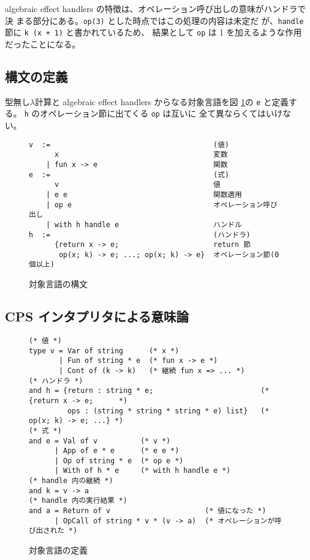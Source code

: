 algebraic effect handlers の特徴は、オペレーション呼び出しの意味がハンドラで決
まる部分にある。\texttt{op(3)} とした時点ではこの処理の内容は未定だ
が、\texttt{handle} 節に \texttt{k (x + 1)} と書かれているため、
結果として \texttt{op} は 1 を加えるような作用だったことになる。

\subsection{構文の定義}
\label{subsection:syntax}
型無し$\lambda$計算と algebraic effect handlers からなる対象言語を図 \ref{figure:abstract_syntax}の \texttt{e} と定義する。
\texttt{h} のオペレーション節に出てくる \texttt{op} は互いに
全て異ならくてはいけない。

\begin{figure}[t]
\begin{spacing}{0.9}
\begin{verbatim}
v  :=                                      (値)
      x                                    変数
    | fun x -> e                           関数
e  :=                                      (式)
      v                                    値
    | e e                                  関数適用
    | op e                                 オペレーション呼び出し
    | with h handle e                      ハンドル
h  :=                                      (ハンドラ)
      {return x -> e;                      return 節
       op(x; k) -> e; ...; op(x; k) -> e}  オペレーション節(0個以上)
\end{verbatim}
\end{spacing}
\caption{対象言語の構文}
\label{figure:abstract_syntax}
\end{figure}

\subsection{CPS インタプリタによる意味論}
\label{subsection:1cps}

\begin{figure}[t]
\begin{spacing}{0.9}
\begin{verbatim}
(* 値 *)
type v = Var of string      (* x *)
       | Fun of string * e  (* fun x -> e *)
       | Cont of (k -> k)   (* 継続 fun x => ... *)
(* ハンドラ *)
and h = {return : string * e;                         (* {return x -> e;      *)
         ops : (string * string * string * e) list}   (*  op(x; k) -> e; ...} *)
(* 式 *)
and e = Val of v          (* v *)
      | App of e * e      (* e e *)
      | Op of string * e  (* op e *)
      | With of h * e     (* with h handle e *)
(* handle 内の継続 *)
and k = v -> a
(* handle 内の実行結果 *)
and a = Return of v                      (* 値になった *)
      | OpCall of string * v * (v -> a)  (* オペレーションが呼び出された *)
\end{verbatim}
\caption{対象言語の定義}
\label{figure:syntax}
\end{spacing}
\end{figure}


